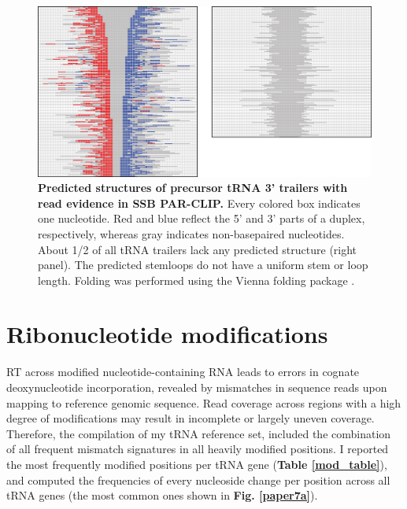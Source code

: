 \documentclass[12pt]{rockefeller}
\begin{document}
\begin{figure}[!ht]%
\centering
\includegraphics[width=\textwidth]{supp5.png}%
\caption[Predicted structures of precursor tRNA 3’ trailers with read evidence in SSB PAR-CLIP.]
{\textbf{Predicted structures of precursor tRNA 3’ trailers with read evidence in SSB PAR-CLIP.}
Every colored box indicates one nucleotide. Red and blue reflect the 5’ and 3’ parts of a duplex, respectively, whereas gray indicates non-basepaired nucleotides. About 1/2 of all tRNA trailers lack any predicted structure (right panel). The predicted stemloops do not have a uniform stem or loop length. Folding was performed using the Vienna folding package \cite{Lorenz:2011it}.}
\centering
\label{supp5}%
\end{figure}

\section{Ribonucleotide modifications}\label{modifications}

RT across modified nucleotide-containing RNA leads to errors in cognate deoxynucleotide incorporation, revealed by mismatches in sequence reads upon mapping to reference genomic sequence. Read coverage across regions with a high degree of modifications may result in incomplete or largely uneven coverage. Therefore, the compilation of my tRNA reference set, included the combination of all frequent mismatch signatures in all heavily modified positions. I reported the most frequently modified positions per tRNA gene (\textbf{Table \ref{mod_table}}), and computed the frequencies of every nucleoside change per position across all tRNA genes (the most common ones shown in \textbf{Fig. \ref{paper7a}}).
\end{document}
